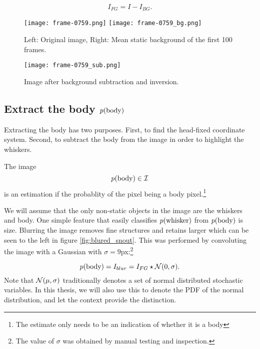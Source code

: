 \begin{equation}
  I_{FG} = I - I_{BG}.
\end{equation}

\begin{figure}
\begin{center}
    \texttt{[image: frame-0759.png]}
    \texttt{[image: frame-0759\_bg.png]}
\end{center}
\caption{Left: Original image, Right: Mean static background of the first 100 frames.}
\label{fig:original_bg}
\end{figure}
\begin{figure}
\begin{center}
    \texttt{[image: frame-0759\_sub.png]}
\end{center}
\caption{Image after background subtraction and inversion.}
\label{fig:subtract}
\end{figure}

\subsection{Extract the body $p{(\text{body})}$}
\label{sec:findbody}
Extracting the body has two purposes. First, to find the head-fixed
coordinate system. Second, to subtract the body from the image in
order to highlight the whiskers.

\begin{definition}
  The image
  \begin{equation}
    p{(\text{body})}\in \mathcal{I}
  \end{equation} is an estimation if the probablity of the pixel
  being a body pixel.\footnote{The estimate only needs to
    be an indication of whether it is a body}
\end{definition}

We will assume that the only non-static objects in the image are the
whiskers and body. One simple feature that easily classifies
$p{(\text{whisker})}$ from $p{(\text{body})}$ is size. Blurring
the image removes fine structures and retains larger which can be seen to the left in figure \ref{fig:blured_snout}.  This was
performed by convoluting the image with a Gaussian with
${\sigma=9}$px:\footnote{The value of $\sigma$ was obtained by manual
  testing and inspection.}

\begin{equation}
  p{(\text{body})} = I_{blur} = I_{FG} \star \mathcal{N}{\left(0, \sigma\right)}.
\end{equation}
Note that $\mathcal{N}{\left(\mu, \sigma\right)}$ traditionally denotes a set of normal
distributed stochastic variables. In this thesis, we will also use
this to denote the PDF of the normal distribution, and let the context
provide the distinction.

